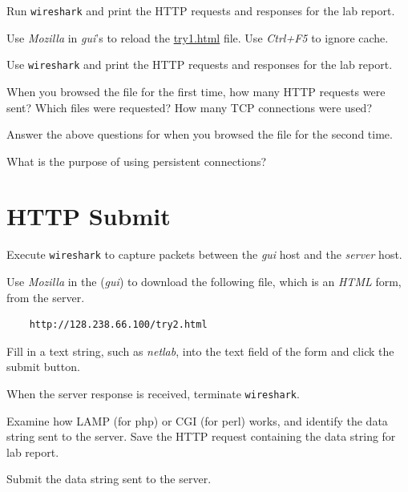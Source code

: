 \documentclass{UTNetLab}
\begin{document}
    Run \lstinline{wireshark} and print the HTTP requests and responses for the lab report.
    
    Use \textit{Mozilla} in  \textit{gui}'s to reload the \url{try1.html} file. Use \textit{Ctrl+F5} to ignore cache.

Use \lstinline{wireshark} and print the HTTP requests and responses for the lab report.

    \begin{report}
        \item When you browsed the  file for the first time, how many HTTP requests were sent?
        Which files were requested?
        How many TCP connections were used?
        
        \item Answer the above questions for when you browsed the  file for the second time.
        
        \item What is the purpose of using persistent connections?
    \end{report}



\section{HTTP Submit}
Execute \lstinline{wireshark} to capture packets between the \textit{gui} host and the \textit{server} host.

    Use \textit{Mozilla} in the  (\textit{gui}) to download the following file, which is an \textit{HTML} form, from the server.
     
   	\begin{lstlisting}
	http://128.238.66.100/try2.html
	\end{lstlisting}
    

    Fill in a text string, such as \textit{netlab}, into the text field of the form and click the submit button. 

    When the server response is received, terminate \lstinline{wireshark}. 

    Examine how LAMP (for php) or CGI (for perl) works, and identify the data string sent to the server.
    Save the HTTP request containing the data string for lab report.

    \begin{report}
    \item Submit the data string sent to the server.
    \end{report}
\end{document}
